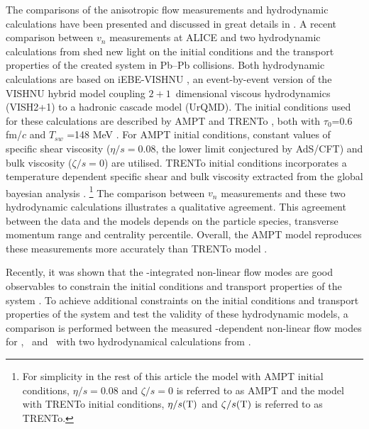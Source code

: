 The comparisons of the anisotropic flow measurements and hydrodynamic calculations have been presented and discussed in great details in \cite{Xu:2016hmp, McDonald:2016vlt, Zhao:2017yhj}. A recent comparison between $v_{n}$ measurements at ALICE \cite{Acharya:2018zuq} and two hydrodynamic calculations from \cite{Zhao:2017yhj} shed new light on the initial conditions and the transport properties of the created system in Pb--Pb collisions. Both hydrodynamic calculations are based on iEBE-VISHNU \cite{Shen:2014vra}, an event-by-event version of the VISHNU hybrid model \cite{Song:2010aq} coupling $2+1$~dimensional viscous hydrodynamics (VISH2+1) \cite{Song:2007fn} to a hadronic cascade model (UrQMD). The initial conditions used for these calculations are described by AMPT \cite{Lin:2004en} and TRENTo \cite{Moreland:2014oya}, both with $\tau_{0}$=0.6 fm/$c$ and $T_{sw}$ =148 MeV \cite{Bernhard:2016tnd}. For AMPT initial conditions, constant values of specific shear viscosity ($\eta/s =0.08$, the lower limit conjectured by AdS/CFT) and bulk viscosity ($\zeta/s = 0$) are utilised. TRENTo \cite{Moreland:2014oya} initial conditions incorporates a temperature dependent specific shear and bulk viscosity extracted from the global bayesian analysis \cite{Bernhard:2016tnd}. \footnote{ For simplicity in the rest of this article the model with AMPT initial conditions, $\eta/s =0.08$ and $\zeta/s =0$ is referred to as AMPT and the model with TRENTo initial conditions, $\eta/s(\rm{T})$ and $\zeta/s(\rm{T})$ is referred to as TRENTo.} The comparison between $v_{n}$ measurements and these two hydrodynamic calculations illustrates a qualitative agreement. This agreement between the data and the models depends on the particle species, transverse momentum range and centrality percentile. Overall, the AMPT model reproduces these measurements more accurately than TRENTo model \cite{Acharya:2018zuq}.

Recently, it was shown that the \pT-integrated non-linear flow modes are good observables to constrain the initial conditions and transport properties of the system \cite{Acharya:2017zfg}. To achieve additional constraints on the initial conditions and transport properties of the system and test the validity of these hydrodynamic models, a comparison is performed between the measured \pT-dependent non-linear flow modes for \pion, \kaon~and \proton~with two hydrodynamical calculations from \cite{Zhao:2017yhj}.


